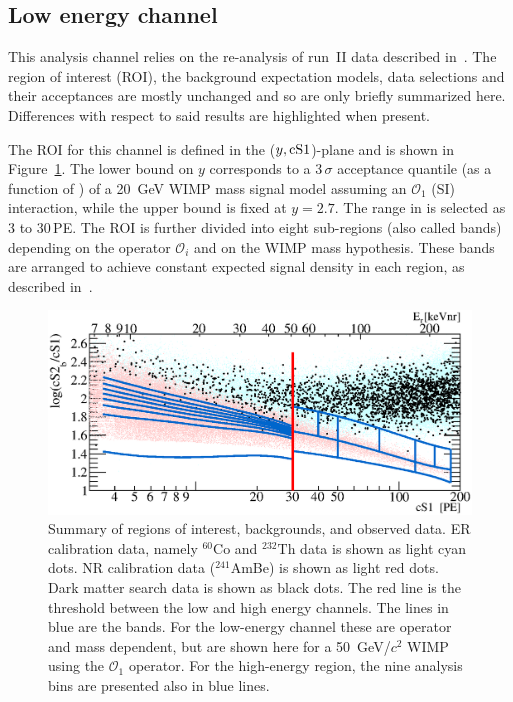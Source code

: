 
\subsection{Low energy channel}
\label{subsec:LowE}
This analysis channel relies on the re-analysis of run~II data described in~\cite{xe100_run_combination}. The region of interest (ROI), the background 
expectation models, data selections and their acceptances are mostly unchanged and so are only briefly summarized here. Differences with respect to said results are highlighted when present.

The ROI for this channel is defined in the ($y,\mathrm{cS1}{}$)-plane and is shown in Figure~\ref{fig:phasespace}.  The lower 
bound on $y$ corresponds to a 3\,$\sigma$ acceptance quantile (as a function of \cSi{}) of a 20~GeV WIMP mass signal model assuming an $\mathcal{O}_1$ (SI) interaction, while the upper bound is fixed at $y=2.7$.
The range in \cSi{} is selected as 3 to 30\,PE. 
The ROI is further divided into eight sub-regions (also called bands) depending on the operator $\mathcal{O}_i$ and on the WIMP mass hypothesis. 
These bands are arranged to achieve constant expected signal density in each region, as described in~\cite{xe100_run_combination}.

\begin{figure}[]
\begin{minipage}{1\linewidth}
\centerline{\includegraphics[width=1\linewidth]{Figures/eft_sr.eps}}
\end{minipage}
\caption{Summary of regions of interest, backgrounds, and observed data. ER calibration data, namely $^{60}\mathrm{Co}$ and $^{232}\mathrm{Th}$ data is shown as light cyan dots. NR calibration data ($^{241}$AmBe) is shown as light red dots. Dark matter search data is shown as black dots. The red line is the threshold between the low and high energy channels. The lines in blue are the bands. For the low-energy channel these are operator and mass dependent, but are shown here for a 50~GeV/$c^2$ WIMP using the $\mathcal{O}_1$ operator. For the high-energy region, the nine analysis bins are presented also in blue lines.
}
\label{fig:phasespace}
\end{figure}  


